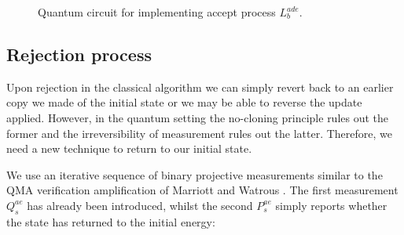\begin{figure}[htbp]
    \centering
{}

\caption{Quantum circuit for implementing accept process $L_b^{ade}$.}
\label{fig:LQ_circuit}
\end{figure}
\subsection{Rejection process}
Upon rejection in the classical algorithm we can simply revert back to an earlier copy we made of the initial state or we may be able to reverse the update applied. However, in the quantum setting the no-cloning principle rules out the former and the irreversibility of measurement rules out the latter. Therefore, we need a new technique to return to our initial state.

We use an iterative sequence of binary projective measurements similar to the QMA verification amplification of Marriott and Watrous \cite{MarriottWatrous}. The first measurement $Q_s^{ae}$ has already been introduced, whilst the second $P_s^{ae}$ simply reports whether the state has returned to the initial energy:


